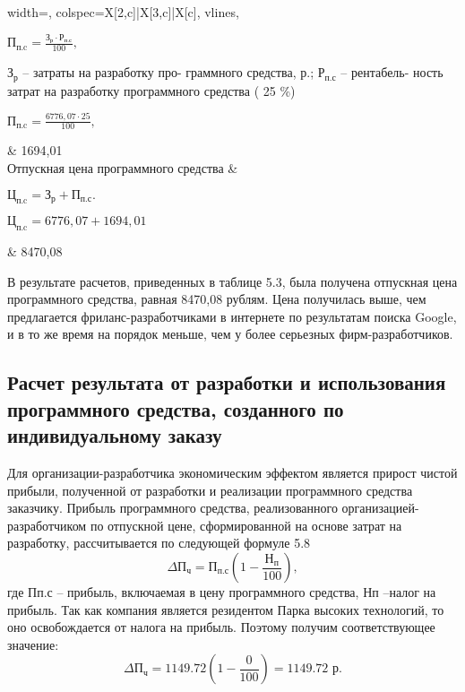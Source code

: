 \begin{table}[H]
\begin{tblr}{
			width=\textwidth,
			colspec={X[2,c]|X[3,c]|X[c]},  %
			vlines,
		}
		\centerline{$ \displaystyle{
				\mathrm{П_{п.c}} = \frac{\mathrm{З_{р}} \cdot \mathrm{Р_{п.с}}}{100},}$}
		$\text{З}_\text{р}$ – затраты на разработку про-
		граммного средства, р.; $\text{Р}_\text{п.с}$ – рентабель-
		ность затрат на разработку программного
		средства ( 25 \%)
		
		\centerline{$ \displaystyle{	\mathrm{П_{п.c}} = \frac{6776{,}07 \cdot 25}{100}, }$}
		
		& 1694,01   \\
		\hline
		Отпускная цена программного
		средства & 
		\centerline{$ \displaystyle{
				\mathrm{Ц_{п.c}} = {\mathrm{З_{р}} + \mathrm{П_{п.с}}}.
			}$}
		\centerline{$ \displaystyle{	\mathrm{Ц_{п.c}} = {6776{,}07} + {1694,01} }$}
		& 8470,08  \\
		\hline
		
		
	\end{tblr}
	
\end{table}


В результате расчетов, приведенных в таблице 5.3, была получена отпускная цена программного средства, равная 8470,08 рублям. Цена получилась выше, чем предлагается фриланс-разработчиками в интернете по результатам поиска Google, и в то же время на порядок меньше, чем у более серьезных фирм-разработчиков. 


\subsection{Расчет результата от разработки и использования программного средства, созданного по индивидуальному заказу} 


Для организации-разработчика экономическим эффектом является прирост чистой прибыли, полученной от разработки и реализации программного средства заказчику.
Прибыль программного средства, реализованного организацией-разработчиком по отпускной цене, сформированной на основе затрат на разработку, рассчитывается по следующей формуле 5.8
\begin{equation}
	\Delta 	\mathrm{П_{ч}} = \mathrm{П_{п.с}} \left( 1 - \frac{	\mathrm{Н_{п}}}{100} \right),
\end{equation}
где Пп.с – прибыль, включаемая в цену программного средства, Нп –налог на прибыль. Так как компания является резидентом Парка высоких технологий, то оно освобождается от налога на прибыль. Поэтому получим соответствующее значение:
\[
\Delta \mathrm{П_{ч}} = 1149.72 \left(1 - \frac{0}{100}\right) = 1149.72 \text{ р}.
\]

